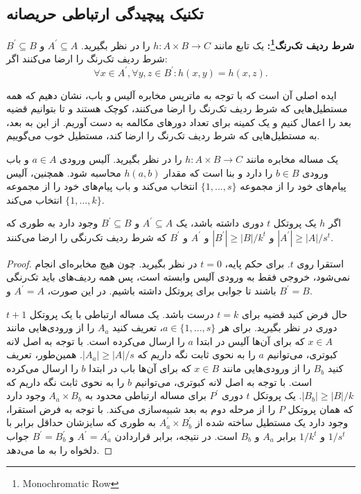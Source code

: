 \subsection{تکنیک پیچیدگی ارتباطی حریصانه}
\begin{definition}
\textbf{شرط ردیف تک‌رنگ\footnote{Monochromatic Row}:}
یک تابع مانند $h:A\times B \rightarrow C$ را در نظر بگیرید. $A^{'} \subseteq A$ و $B^{'} \subseteq B$ شرط ردیف تک‌رنگ را ارضا می‌کنند اگر:
\begin{equation}
	\forall x \in A^{'}, \forall y,z \in B^{'}: h(x,y) = h(x,z).
\end{equation}
\end{definition}
ایده اصلی آن است که با توجه به ماتریس مخابره آلیس و باب، نشان دهیم که همه مستطیل‌هایی که شرط ردیف تک‌رنگ را ارضا می‌کنند، کوچک هستند و تا بتوانیم قضیه بعد را اعمال کنیم و یک کمینه برای تعداد دورهای مکالمه به دست آوریم. از این به بعد، به مستطیل‌هایی که شرط ردیف تک‌رنگ را ارضا کند، مستطیل خوب می‌گوییم. 

یک مساله مخابره مانند $h:A\times B \rightarrow C$ را در نظر بگیرید. آلیس ورودی $ a \in A$ و باب ورودی $b \in B$ را دارد و بنا است که مقدار $h(a,b)$ محاسبه شود. همچنین، آلیس پیام‌های خود را از مجموعه $\{1,...,s\}$ انتخاب می‌کند و باب پیام‌های خود را از مجموعه $\{1,...,k\}$ انتخاب می‌کند. 

\begin{theorem}
 اگر $h$ یک پروتکل $t$ دوری داشته باشد، یک $A^{'} \subseteq A$ و $B^{'} \subseteq B$ وجود دارد به طوری که $|A^{'}| \geq |A|/s^{t}$ و $|B^{'}| \geq |B|/k^{t}$ و  $A^{'}$ و $B^{'}$ که شرط ردیف تک‌رنگی را ارضا می‌کنند.
\end{theorem}
 
\begin{proof}
 استقرا روی $t$. برای حکم پایه، $t = 0$ در نظر بگیرید. چون هیچ مخابره‌ای انجام نمی‌شود، خروجی فقط به ورودی آلیس وابسته است، پس همه ردیف‌های باید تک‌رنگی باشند تا جوابی برای پروتکل داشته باشیم. در این‌ صورت، $A^{'} = A$ و $B^{'} = B$. 
 
 حال فرض کنید قضیه برای $t = k$ درست باشد. یک مساله ارتباطی با یک پروتکل $t+1$ دوری در نظر بگیرید. 
 برای هر  $a \in \{ 1,...,s\}$، تعریف کنید $A_{a}$ را از ورودی‌هایی مانند $x \in A$ که برای آن‌ها آلیس در ابتدا $a$ را ارسال می‌کرده است. 
 با توجه به اصل لانه کبوتری، می‌توانیم $a$ را به نحوی ثابت نگه داریم  که $|A_{a}| \geq |A|/s$. 
 همین‌طور،  تعریف کنید $B_{b}$ را از ورودی‌هایی مانند $x \in B $ که برای آن‌ها باب در ابتدا $b$ را ارسال می‌کرده است. 
 با توجه به اصل لانه کبوتری، می‌توانیم $b$ را به نحوی ثابت نگه داریم که $|B_{b}| \geq |B|/k$. 
 یک پروتکل $t$ دوری $P^{'}$ برای مساله ارتباطی محدود به $A_{a} \times B_{b}$ وجود دارد که همان پروتکل $P$ را از مرحله دوم به بعد شبیه‌سازی می‌کند. 
 با توجه به فرض استقرا، وجود دارد یک مستطیل ساخته شده از $A_{a}^{'} \times B_{b}^{'}$ به طوری که سایزشان حداقل برابر با $1/s^{t}$ و $1/k^{t}$ برابر $A_{a}$ و $B_{b}$ است. 
 در نتیجه، برابر قراردادن $A^{'} = A^{'}_{a}$ و $B^{'} = B_{b}^{'}$ جواب دلخواه را به ما می‌دهد. 
\end{proof}

